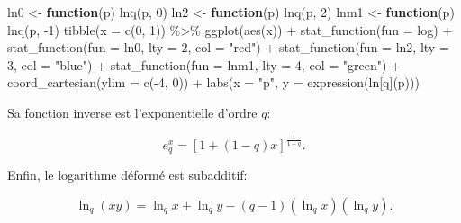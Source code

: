 \documentclass[
  11pt,
  american,
  a4paper,
  extrafontsizes,onecolumn,openright
  ]{memoir}
\newenvironment{Shaded}{\begin{snugshade}}{\end{snugshade}}
\newcommand{\AttributeTok}[1]{\textcolor[rgb]{0.77,0.63,0.00}{#1}}
\newcommand{\ControlFlowTok}[1]{\textcolor[rgb]{0.13,0.29,0.53}{\textbf{#1}}}
\newcommand{\DecValTok}[1]{\textcolor[rgb]{0.00,0.00,0.81}{#1}}
\newcommand{\FunctionTok}[1]{\textcolor[rgb]{0.00,0.00,0.00}{#1}}
\newcommand{\NormalTok}[1]{#1}
\newcommand{\OtherTok}[1]{\textcolor[rgb]{0.56,0.35,0.01}{#1}}
\newcommand{\SpecialCharTok}[1]{\textcolor[rgb]{0.00,0.00,0.00}{#1}}
\newcommand{\StringTok}[1]{\textcolor[rgb]{0.31,0.60,0.02}{#1}}
\begin{document}
\begin{Shaded}
\begin{Highlighting}[]
\NormalTok{ln0 }\OtherTok{\textless{}{-}} \ControlFlowTok{function}\NormalTok{(p) }\FunctionTok{lnq}\NormalTok{(p, }\DecValTok{0}\NormalTok{)}
\NormalTok{ln2 }\OtherTok{\textless{}{-}} \ControlFlowTok{function}\NormalTok{(p) }\FunctionTok{lnq}\NormalTok{(p, }\DecValTok{2}\NormalTok{)}
\NormalTok{lnm1 }\OtherTok{\textless{}{-}} \ControlFlowTok{function}\NormalTok{(p) }\FunctionTok{lnq}\NormalTok{(p, }\SpecialCharTok{{-}}\DecValTok{1}\NormalTok{)}
\FunctionTok{tibble}\NormalTok{(}\AttributeTok{x =} \FunctionTok{c}\NormalTok{(}\DecValTok{0}\NormalTok{, }\DecValTok{1}\NormalTok{)) }\SpecialCharTok{\%\textgreater{}\%} 
  \FunctionTok{ggplot}\NormalTok{(}\FunctionTok{aes}\NormalTok{(x)) }\SpecialCharTok{+} 
    \FunctionTok{stat\_function}\NormalTok{(}\AttributeTok{fun =}\NormalTok{ log) }\SpecialCharTok{+}
    \FunctionTok{stat\_function}\NormalTok{(}\AttributeTok{fun =}\NormalTok{ ln0, }\AttributeTok{lty =} \DecValTok{2}\NormalTok{, }\AttributeTok{col =} \StringTok{"red"}\NormalTok{) }\SpecialCharTok{+}
    \FunctionTok{stat\_function}\NormalTok{(}\AttributeTok{fun =}\NormalTok{ ln2, }\AttributeTok{lty =} \DecValTok{3}\NormalTok{, }\AttributeTok{col =} \StringTok{"blue"}\NormalTok{) }\SpecialCharTok{+}
    \FunctionTok{stat\_function}\NormalTok{(}\AttributeTok{fun =}\NormalTok{ lnm1, }\AttributeTok{lty =} \DecValTok{4}\NormalTok{, }\AttributeTok{col =} \StringTok{"green"}\NormalTok{) }\SpecialCharTok{+}
    \FunctionTok{coord\_cartesian}\NormalTok{(}\AttributeTok{ylim =} \FunctionTok{c}\NormalTok{(}\SpecialCharTok{{-}}\DecValTok{4}\NormalTok{, }\DecValTok{0}\NormalTok{)) }\SpecialCharTok{+}
    \FunctionTok{labs}\NormalTok{(}\AttributeTok{x =} \StringTok{"p"}\NormalTok{, }\AttributeTok{y =} \FunctionTok{expression}\NormalTok{(ln[q](p)))}
\end{Highlighting}
\end{Shaded}

\normalsize

Sa fonction inverse est l'exponentielle d'ordre \(q\):

\begin{equation}
  \label{eq:expq}
  e^x_q = \left[ 1 + \left( 1 - q \right) x \right]^{\frac{1}{1 - q}}.
\end{equation}

Enfin, le logarithme déformé est subadditif:

\begin{equation}
  \label{eq:lnqsubadd}
  \ln_q\left( xy \right)
  = \ln_q{x} + \ln_q{y} 
    - \left( q - 1 \right) \left( \ln_q{x} \right) \left( \ln_q{y} \right).
\end{equation}
\end{document}
